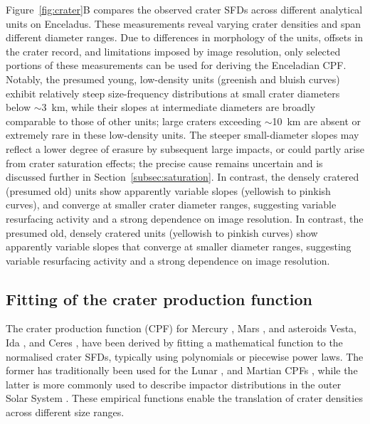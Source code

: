 \documentclass[preprint,11pt,3p,times,authoryear]{elsarticle}
\begin{document}
Figure~\ref{fig:crater}B compares the observed crater SFDs across different analytical units on Enceladus. These measurements reveal varying crater densities and span different diameter ranges. Due to differences in morphology of the units, offsets in the crater record, and limitations imposed by image resolution, only selected portions of these measurements can be used for deriving the Enceladian CPF. 
Notably, the presumed young, low-density units (greenish and bluish curves) exhibit relatively steep size-frequency distributions at small crater diameters below ${\sim}$3~km, while their slopes at intermediate diameters are broadly comparable to those of other units; large craters exceeding ${\sim}$10~km are absent or extremely rare in these low-density units. The steeper small-diameter slopes may reflect a lower degree of erasure by subsequent large impacts, or could partly arise from crater saturation effects; the precise cause remains uncertain and is discussed further in Section~\ref{subsec:saturation}.
In contrast, the densely cratered (presumed old) units show apparently variable slopes (yellowish to pinkish curves), and converge at smaller crater diameter ranges, suggesting variable resurfacing activity and a strong dependence on image resolution.
In contrast, the presumed old, densely cratered units (yellowish to pinkish curves) show apparently variable slopes that converge at smaller diameter ranges, suggesting variable resurfacing activity and a strong dependence on image resolution.

\subsection{Fitting of the crater production function}
\label{subsec:fitting}
The crater production function (CPF) for Mercury \citep{Neukum2001}, Mars \citep{Ivanov2001, Hartmann2005}, and asteroids Vesta, Ida \citep{Schmedemann2014}, and Ceres \citep{Hiesinger2016}, have been derived by fitting a mathematical function to the normalised crater SFDs, typically using polynomials or piecewise power laws. The former has traditionally been used for the Lunar \citep{Neukum2001}, and Martian CPFs \citep{Ivanov2001}, while the latter is more commonly used to describe impactor distributions in the outer Solar System \citep{Zahnle2003}. These empirical functions enable the translation of crater densities across different size ranges. \\
\end{document}
